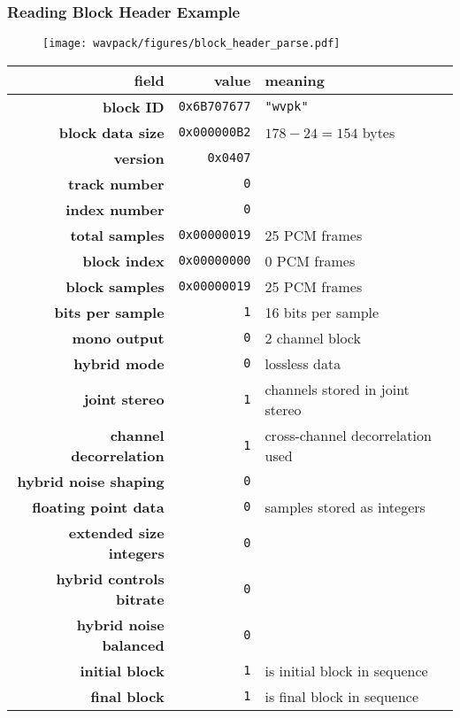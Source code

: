 \subsubsection{Reading Block Header Example}
\begin{figure}[h]
  \texttt{[image: wavpack/figures/block\_header\_parse.pdf]}
\end{figure}

{
  \begin{tabular}{rrl}
    field & value & meaning \\
    \hline
    \textbf{block ID} & \texttt{0x6B707677} & \texttt{"wvpk"} \\
    \textbf{block data size} & \texttt{0x000000B2} & $178 - 24 = 154$ bytes \\
    \textbf{version} & \texttt{0x0407} \\
    \textbf{track number} & \texttt{0} \\
    \textbf{index number} & \texttt{0} \\
    \textbf{total samples} & \texttt{0x00000019} & 25 PCM frames \\
    \textbf{block index} & \texttt{0x00000000} & 0 PCM frames \\
    \textbf{block samples} & \texttt{0x00000019} & 25 PCM frames \\
    \textbf{bits per sample} & \texttt{1} & 16 bits per sample \\
    \textbf{mono output} & \texttt{0} & 2 channel block \\
    \textbf{hybrid mode} & \texttt{0} & lossless data \\
    \textbf{joint stereo} & \texttt{1} & channels stored in joint stereo \\
    \textbf{channel decorrelation} & \texttt{1} & cross-channel decorrelation used \\
    \textbf{hybrid noise shaping} & \texttt{0} \\
    \textbf{floating point data} & \texttt{0} & samples stored as integers \\
    \textbf{extended size integers} & \texttt{0} \\
    \textbf{hybrid controls bitrate} & \texttt{0} \\
    \textbf{hybrid noise balanced} & \texttt{0} \\
    \textbf{initial block} & \texttt{1} & is initial block in sequence \\
    \textbf{final block} & \texttt{1} & is final block in sequence \\

\end{tabular}}
